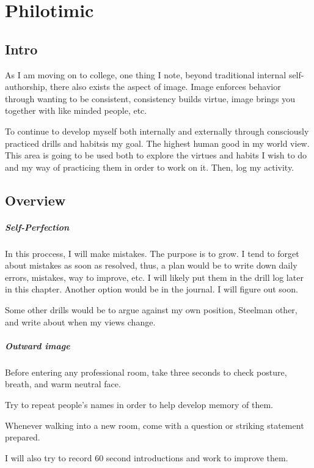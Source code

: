 \chapter{Philotimic}

\section{Intro}
As I am moving on to college, one thing I note, beyond traditional internal self-authorship, there also exists the aspect of image. Image enforces behavior through wanting to be consistent, consistency builds virtue, image brings you together with like minded people, etc.

To continue to develop myself both internally and externally through consciously practiced drills and habitsis my goal. The highest human good in my world view. This area is going to be used both to explore the virtues and habits I wish to do and my way of practicing them in order to work on it. Then, log my activity.
\section{Overview}
\paragraph{Self-Perfection}

In this proccess, I will make mistakes. The purpose is to grow. I tend to forget about mistakes as soon as resolved, thus, a plan would be to write down daily errors, mistakes, way to improve, etc. I will likely put them in the drill log later in this chapter. Another option would be in the journal. I will figure out soon.

Some other drills would be to argue against my own position, Steelman other, and write about when my views change.

\paragraph{Outward image}
Before entering any professional room, take three seconds to check posture, breath, and warm neutral face.

Try to repeat people's names in order to help develop memory of them.

Whenever walking into a new room, come with a question or striking statement prepared.

I will also try to record 60 second introductions and work to improve them.

